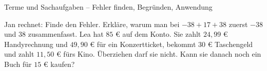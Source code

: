 \begin{aufgabe}{Terme und Sachaufgaben – Fehler finden, Begründen, Anwendung}
\begin{teile}
\teil Jan rechnet:  Finde den Fehler.
\teil Erkläre, warum man bei $-38 + 17 + 38$ zuerst $-38$ und $38$ zusammenfasst.
\teil Lea hat $85$ € auf dem Konto. Sie zahlt $24{,}99$ € Handyrechnung und $49{,}90$ € für ein Konzertticket, bekommt $30$ € Taschengeld und zahlt $11{,}50$ € fürs Kino. Überziehen darf sie nicht. Kann sie danach noch ein Buch für $15$ € kaufen?
\end{teile}
\end{aufgabe}
